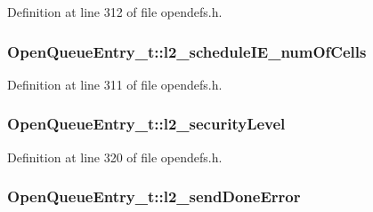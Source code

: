 Definition at line 312 of file opendefs.\+h.

\subsubsection[{\texorpdfstring{l2\+\_\+schedule\+I\+E\+\_\+num\+Of\+Cells}{l2_scheduleIE_numOfCells}}]{ Open\+Queue\+Entry\+\_\+t\+::l2\+\_\+schedule\+I\+E\+\_\+num\+Of\+Cells}\hypertarget{struct_open_queue_entry__t_a20c7a685285a9129a83b0a39a5a80d24}{}\label{struct_open_queue_entry__t_a20c7a685285a9129a83b0a39a5a80d24}


Definition at line 311 of file opendefs.\+h.

\subsubsection[{\texorpdfstring{l2\+\_\+security\+Level}{l2_securityLevel}}]{ Open\+Queue\+Entry\+\_\+t\+::l2\+\_\+security\+Level}\hypertarget{struct_open_queue_entry__t_a48ace94104110f6a3b1ec567adcaa4d5}{}\label{struct_open_queue_entry__t_a48ace94104110f6a3b1ec567adcaa4d5}


Definition at line 320 of file opendefs.\+h.

\subsubsection[{\texorpdfstring{l2\+\_\+send\+Done\+Error}{l2_sendDoneError}}]{ Open\+Queue\+Entry\+\_\+t\+::l2\+\_\+send\+Done\+Error}\hypertarget{struct_open_queue_entry__t_a64229ab4680ff8dfca3d7dca6cc57470}{}\label{struct_open_queue_entry__t_a64229ab4680ff8dfca3d7dca6cc57470}


